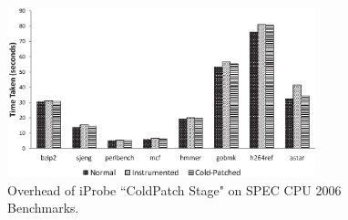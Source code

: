 




\begin{figure}[!ht]
  \begin{center}
    \includegraphics[width=0.8\textwidth]{iprobe/Images/OverheadCold.eps}
    \caption{Overhead of iProbe ``ColdPatch Stage" on SPEC CPU 2006 Benchmarks.}
    \label{fig:overhead_table}
  \end{center}
\end{figure}


